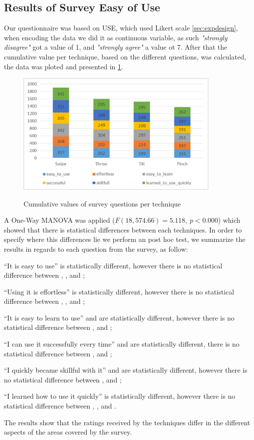 \subsection{Results of Survey Easy of Use}
Our questionnaire was based on USE, which used Likert scale \ref*{sec:expdesign}, when encoding the data we did it as continuous variable, as such \emph{"strongly disagree"} got a value of 1, and \emph{"strongly agree"} a value ot 7. After that the cumulative value per technique, based on the different questions, was calculated, the data was ploted and presented in \ref{fig:surveyResult}. 
\begin{figure}[H]
	{\includegraphics[width = 1\columnwidth , height = 6cm ]{images/survey-data.png}} 
	\caption{
		Cumulative values of survey questions per technique
	}
	\label{fig:surveyResult}
\end{figure}

A One-Way MANOVA was applied ($F(18, 574.66)=5.118,\ p<0.000$) which showed that there is statistical differences between each techniques. 
In order to specify where this differences lie we perform an post hoc test, we summarize the results in regards to each question from the survey, as follow:
\begin{enumerate*}[label=\itshape\arabic*\upshape)]
	\item{``It is easy to use'' \swipe is statistically different, however there is no statistical difference between \throw, \tilt, and \pinch;}
	\item{``Using it is effortless'' \swipe is statistically different, however there is no statistical difference between \throw, \tilt, and \pinch;}
	\item{``It is easy to learn to use''  \swipe and \pinch are statistically different, however there is no statistical difference between \tilt, and \throw;}
	\item{``I can use it successfully every time'' \swipe and \throw are statistically different, there is no statistical difference between \tilt, and \pinch;}
	\item{``I quickly became skillful with it'' \swipe and \throw are statistically different, however there is no statistical difference between \pinch, and \tilt;}
	\item{``I learned how to use it quickly'' \swipe is statistically different, however there is no statistical difference between \throw, \tilt, and \pinch.}
\end{enumerate*}
The results show that the ratings received by the techniques differ in the different aspects of the areas covered by the survey.